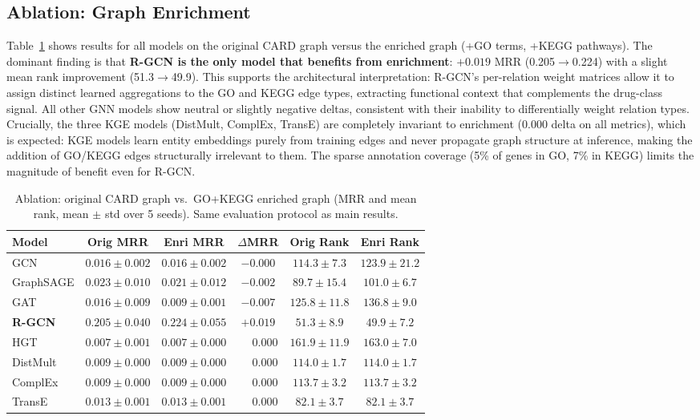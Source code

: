 \documentclass[conference]{IEEEtran}
\begin{document}
\subsection{Ablation: Graph Enrichment}
\label{sec:ablation}

Table~\ref{tab:ablation} shows results for all models on the original CARD graph versus the enriched graph (+GO terms, +KEGG pathways). The dominant finding is that \textbf{R-GCN is the only model that benefits from enrichment}: $+0.019$ MRR (0.205$\to$0.224) with a slight mean rank improvement (51.3$\to$49.9). This supports the architectural interpretation: R-GCN's per-relation weight matrices allow it to assign distinct learned aggregations to the GO and KEGG edge types, extracting functional context that complements the drug-class signal. All other GNN models show neutral or slightly negative deltas, consistent with their inability to differentially weight relation types. Crucially, the three KGE models (DistMult, ComplEx, TransE) are completely invariant to enrichment (0.000 delta on all metrics), which is expected: KGE models learn entity embeddings purely from training edges and never propagate graph structure at inference, making the addition of GO/KEGG edges structurally irrelevant to them. The sparse annotation coverage (5\% of genes in GO, 7\% in KEGG) limits the magnitude of benefit even for R-GCN.

\begin{table}[h]
\centering
\caption{Ablation: original CARD graph vs.\ GO+KEGG enriched graph (MRR and mean rank, mean $\pm$ std over 5 seeds). Same evaluation protocol as main results.}
\label{tab:ablation}
\begin{tabular}{lccccc}
\toprule
\textbf{Model} & \textbf{Orig MRR} & \textbf{Enri MRR} & \textbf{$\Delta$MRR} & \textbf{Orig Rank} & \textbf{Enri Rank} \\
\midrule
GCN       & $0.016 \pm 0.002$ & $0.016 \pm 0.002$ & $-0.000$ & $114.3 \pm 7.3$  & $123.9 \pm 21.2$ \\
GraphSAGE & $0.023 \pm 0.010$ & $0.021 \pm 0.012$ & $-0.002$ & $89.7 \pm 15.4$  & $101.0 \pm 6.7$ \\
GAT       & $0.016 \pm 0.009$ & $0.009 \pm 0.001$ & $-0.007$ & $125.8 \pm 11.8$ & $136.8 \pm 9.0$ \\
\textbf{R-GCN} & $0.205 \pm 0.040$ & $0.224 \pm 0.055$ & $\mathbf{+0.019}$ & $51.3 \pm 8.9$ & $49.9 \pm 7.2$ \\
HGT       & $0.007 \pm 0.001$ & $0.007 \pm 0.000$ & $\phantom{+}0.000$ & $161.9 \pm 11.9$ & $163.0 \pm 7.0$ \\
DistMult  & $0.009 \pm 0.000$ & $0.009 \pm 0.000$ & $\phantom{+}0.000$ & $114.0 \pm 1.7$  & $114.0 \pm 1.7$ \\
ComplEx   & $0.009 \pm 0.000$ & $0.009 \pm 0.000$ & $\phantom{+}0.000$ & $113.7 \pm 3.2$  & $113.7 \pm 3.2$ \\
TransE    & $0.013 \pm 0.001$ & $0.013 \pm 0.001$ & $\phantom{+}0.000$ & $82.1 \pm 3.7$   & $82.1 \pm 3.7$ \\
\bottomrule
\end{tabular}
\end{table}
\end{document}
